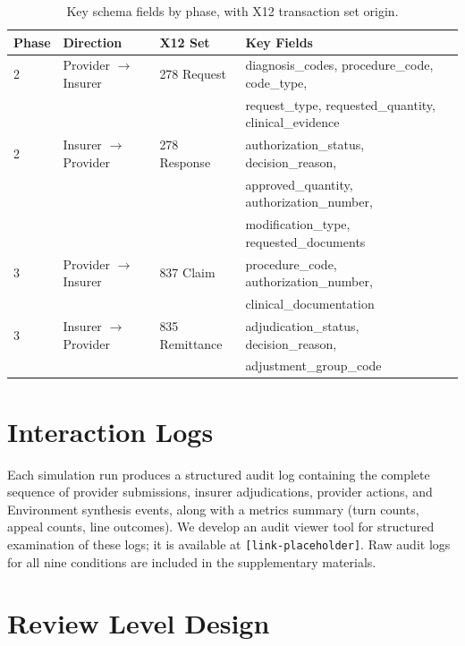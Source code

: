 \begin{table}[t]
\centering
\caption{Key schema fields by phase, with X12 transaction set origin.}
\label{tab:schema-fields}
\begin{tabular}{llll}
\toprule
\textbf{Phase} & \textbf{Direction} & \textbf{X12 Set} & \textbf{Key Fields} \\
\midrule
2 & Provider $\to$ Insurer & 278 Request & diagnosis\_codes, procedure\_code, code\_type, \\
  &                        &             & request\_type, requested\_quantity, clinical\_evidence \\
2 & Insurer $\to$ Provider & 278 Response & authorization\_status, decision\_reason, \\
  &                        &              & approved\_quantity, authorization\_number, \\
  &                        &              & modification\_type, requested\_documents \\
3 & Provider $\to$ Insurer & 837 Claim    & procedure\_code, authorization\_number, \\
  &                        &              & clinical\_documentation \\
3 & Insurer $\to$ Provider & 835 Remittance & adjudication\_status, decision\_reason, \\
  &                        &                & adjustment\_group\_code \\
\bottomrule
\end{tabular}
\end{table}

\section{Interaction Logs}
\label{sec:logs}

Each simulation run produces a structured audit log containing the complete sequence of provider submissions, insurer adjudications, provider actions, and Environment synthesis events, along with a metrics summary (turn counts, appeal counts, line outcomes). We develop an audit viewer tool for structured examination of these logs; it is available at \texttt{[link-placeholder]}. Raw audit logs for all nine conditions are included in the supplementary materials.

\section{Review Level Design}
\label{sec:appeal-levels}


